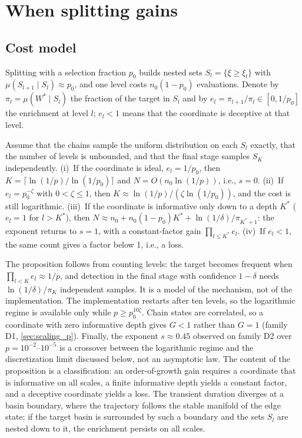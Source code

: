 \section{When splitting gains}\label{sec:theory}

\subsection{Cost model}\label{sec:costmodel}

Splitting with a selection fraction $p_0$ builds nested sets $S_l=\{\xi\ge\xi_l\}$ with $\mu(S_{l+1}\mid S_l)\approx p_0$, and one level costs $n_0(1-p_0)$ evaluations. Denote by $\pi_l=\mu(W^*\mid S_l)$ the fraction of the target in $S_l$ and by $e_l=\pi_{l+1}/\pi_l\in[0,1/p_0]$ the enrichment at level $l$; $e_l<1$ means that the coordinate is deceptive at that level.

\begin{proposition}\label{prop:cost}
Assume that the chains sample the uniform distribution on each $S_l$ exactly, that the number of levels is unbounded, and that the final stage samples $S_K$ independently. \textup{(i)}~If the coordinate is ideal, $e_l=1/p_0$, then $K=\lceil\ln(1/p)/\ln(1/p_0)\rceil$ and $N=O(n_0\ln(1/p))$, i.e., $s=0$. \textup{(ii)}~If $e_l=p_0^{-\zeta}$ with $0<\zeta\le1$, then $K\approx\ln(1/p)/(\zeta\ln(1/p_0))$, and the cost is still logarithmic. \textup{(iii)}~If the coordinate is informative only down to a depth $K^*$ ($e_l=1$ for $l>K^*$), then $N\approx n_0+n_0(1-p_0)K^*+\ln(1/\delta)/\pi_{K^*+1}$: the exponent returns to $s=1$, with a constant-factor gain $\prod_{l\le K^*}e_l$. \textup{(iv)}~If $e_l<1$, the same count gives a factor below 1, i.e., a loss.
\end{proposition}

The proposition follows from counting levels: the target becomes frequent when $\prod_{l<K}e_l\approx1/p$, and detection in the final stage with confidence $1-\delta$ needs $\ln(1/\delta)/\pi_K$ independent samples. It is a model of the mechanism, not of the implementation. The implementation restarts after ten levels, so the logarithmic regime is available only while $p\ge p_0^{10\zeta}$. Chain states are correlated, so a coordinate with zero informative depth gives $G<1$ rather than $G=1$ (family D1, \cref{sec:scaling_p}). Finally, the exponent $s\approx0.45$ observed on family D2 over $p=10^{-2}$--$10^{-5}$ is a crossover between the logarithmic regime and the discretization limit discussed below, not an asymptotic law. The content of the proposition is a classification: an order-of-growth gain requires a coordinate that is informative on all scales, a finite informative depth yields a constant factor, and a deceptive coordinate yields a loss. The transient duration diverges at a basin boundary, where the trajectory follows the stable manifold of the edge state; if the target basin is surrounded by such a boundary and the sets $S_l$ are nested down to it, the enrichment persists on all scales.


